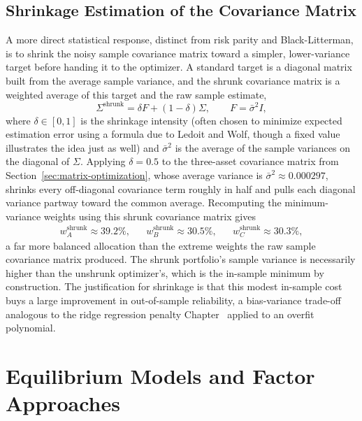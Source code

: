 \documentclass[../ai_in_finance]{subfiles}
\begin{document}
\subsection{Shrinkage Estimation of the Covariance Matrix}
\label{sec:shrinkage}

A more direct statistical response, distinct from risk parity and Black-Litterman, is to shrink the noisy sample covariance matrix toward a simpler, lower-variance target before handing it to the optimizer. A standard target is a diagonal matrix built from the average sample variance, and the shrunk covariance matrix is a weighted average of this target and the raw sample estimate,
\begin{equation*}
\Sigma^{\text{shrunk}} = \delta F + (1-\delta)\Sigma, \qquad F = \bar\sigma^2 I,
\end{equation*}
where $\delta \in [0,1]$ is the shrinkage intensity (often chosen to minimize expected estimation error using a formula due to Ledoit and Wolf, though a fixed value illustrates the idea just as well) and $\bar\sigma^2$ is the average of the sample variances on the diagonal of $\Sigma$. Applying $\delta=0.5$ to the three-asset covariance matrix from Section~\ref{sec:matrix-optimization}, whose average variance is $\bar\sigma^2 \approx 0.000297$, shrinks every off-diagonal covariance term roughly in half and pulls each diagonal variance partway toward the common average. Recomputing the minimum-variance weights using this shrunk covariance matrix gives
\begin{align*}
w_A^{\text{shrunk}} \approx 39.2\%, & & w_B^{\text{shrunk}} \approx 30.5\%, & & w_C^{\text{shrunk}} \approx 30.3\%,
\end{align*}
a far more balanced allocation than the extreme weights the raw sample covariance matrix produced. The shrunk portfolio's sample variance is necessarily higher than the unshrunk optimizer's, which is the in-sample minimum by construction. The justification for shrinkage is that this modest in-sample cost buys a large improvement in out-of-sample reliability, a bias-variance trade-off analogous to the ridge regression penalty Chapter~ applied to an overfit polynomial.

\section{Equilibrium Models and Factor Approaches}
\end{document}
